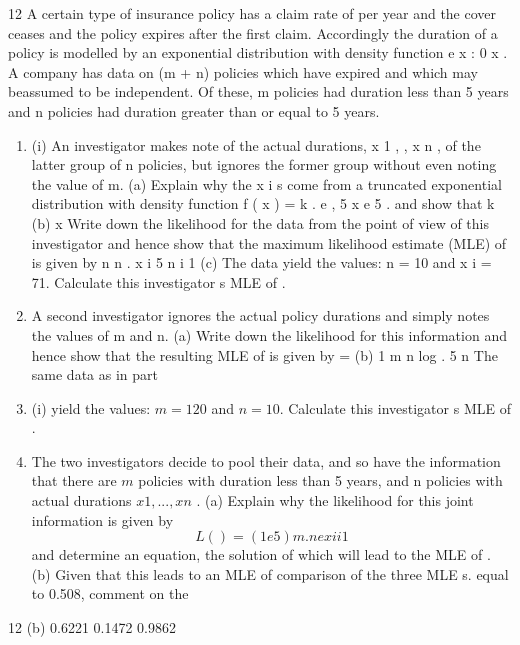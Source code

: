 \documentclass[a4paper,12pt]{article}
\begin{document}
12
A certain type of insurance policy has a claim rate of per year and the cover ceases and the policy expires after the first claim. Accordingly the duration of a policy is modelled by an exponential distribution with density function e x : 0 x
.
A company has data on (m + n) policies which have expired and which may beassumed to be independent. Of these, m policies had duration less than 5 years and n policies had duration greater than or equal to 5 years.

\begin{enumerate}
\item (i)
An investigator makes note of the actual durations, x 1 , , x n , of the latter group of n policies, but ignores the former group without even noting the value of m.
(a)
Explain why the x i s come from a truncated exponential distribution
with density function
f ( x ) = k . e
, 5
x
e 5 .
and show that k
(b)
x
Write down the likelihood for the data from the point of view of this investigator and hence show that the maximum likelihood estimate
(MLE) of is given by
n
n
.
x i 5 n
i 1
(c)
The data yield the values: n = 10 and x i = 71. Calculate this investigator s MLE of .

\item %
A second investigator ignores the actual policy durations and simply notes the values of m and n.
(a)
Write down the likelihood for this information and hence show that the resulting MLE of is given by
=
(b)
1
m n
log
.
5
n
The same data as in part \item (i) yield the values: $m = 120$ and $n = 10$.
Calculate this investigator s MLE of .
\item %
The two investigators decide to pool their data, and so have the information that there are $m$ policies with duration less than 5 years, and n policies with actual durations $x 1 , ... , x n$ .
(a)
Explain why the likelihood for this joint information is given by
\[L ( ) = (1 e
5
) m .
n
e
x i
i 1\]
and determine an equation, the solution of which will lead to the MLE
of .
(b)
Given that this leads to an MLE of comparison of the three MLE s.
equal to 0.508, comment on the
\end{enumerate}
\newpage

12
(b) 0.6221
0.1472
0.9862
\end{document}
